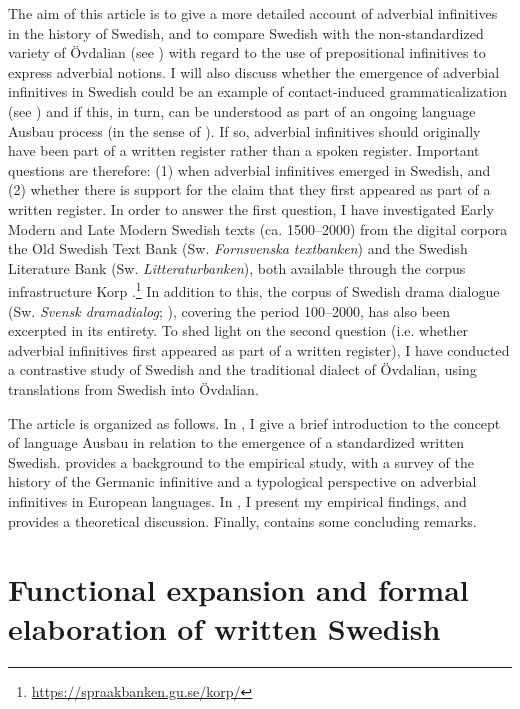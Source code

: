 \documentclass[output=paper]{langscibook}
\begin{document}
The aim of this article is to give a more detailed account of adverbial infinitives in the history of Swedish, and to compare Swedish with the non-standardized variety of Övdalian (see ) with regard to the use of prepositional infinitives to express adverbial notions. I will also discuss whether the emergence of adverbial infinitives in Swedish could be an example of contact-induced grammaticalization (see \citealt{HeineKuteva2003, HeineKuteva2005}) and if this, in turn, can be understood as part of an ongoing language Ausbau process (in the sense of \citealt{Kloss1967}). If so, adverbial infinitives should originally have been part of a written register rather than a spoken register. Important questions are therefore: (1) when adverbial infinitives emerged in Swedish, and (2) whether there is support for the claim that they first appeared as part of a written register. In order to answer the first question, I have investigated Early Modern and Late Modern Swedish texts (ca. 1500–2000) from the digital corpora the Old Swedish Text Bank (Sw. \textit{Fornsvenska textbanken}) and the Swedish Literature Bank (Sw. \textit{Litteraturbanken}), both available through the corpus infrastructure Korp \citep{BorinEtAl2012}.\footnote{\url{https://spraakbanken.gu.se/korp/}}  In addition to this, the corpus of Swedish drama dialogue (Sw. \textit{Svensk dramadialog}; \citealt{MarttalaStromquist2001}), covering the period 100–2000, has also been excerpted in its entirety. To shed light on the second question (i.e. whether adverbial infinitives first appeared as part of a written register), I have conducted a contrastive study of Swedish and the traditional dialect of Övdalian, using translations from Swedish into Övdalian.



The article is organized as follows. In , I give a brief introduction to the concept of language Ausbau in relation to the emergence of a standardized written Swedish.  provides a background to the empirical study, with a survey of the history of the Germanic infinitive and a typological perspective on adverbial infinitives in European languages. In , I present my empirical findings, and  provides a theoretical discussion. Finally,  contains some concluding remarks. 


\section{Functional expansion and formal elaboration of written Swedish}\label{sec:kalm:2}
\end{document}
